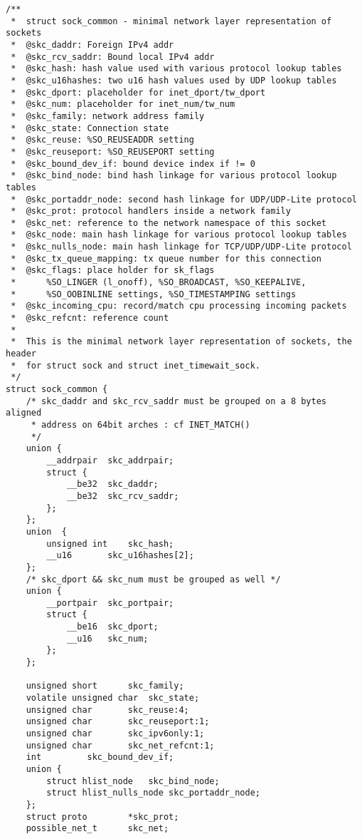 \begin{verbatim}
/**
 *  struct sock_common - minimal network layer representation of sockets
 *  @skc_daddr: Foreign IPv4 addr
 *  @skc_rcv_saddr: Bound local IPv4 addr
 *  @skc_hash: hash value used with various protocol lookup tables
 *  @skc_u16hashes: two u16 hash values used by UDP lookup tables
 *  @skc_dport: placeholder for inet_dport/tw_dport
 *  @skc_num: placeholder for inet_num/tw_num
 *  @skc_family: network address family
 *  @skc_state: Connection state
 *  @skc_reuse: %SO_REUSEADDR setting
 *  @skc_reuseport: %SO_REUSEPORT setting
 *  @skc_bound_dev_if: bound device index if != 0
 *  @skc_bind_node: bind hash linkage for various protocol lookup tables
 *  @skc_portaddr_node: second hash linkage for UDP/UDP-Lite protocol
 *  @skc_prot: protocol handlers inside a network family
 *  @skc_net: reference to the network namespace of this socket
 *  @skc_node: main hash linkage for various protocol lookup tables
 *  @skc_nulls_node: main hash linkage for TCP/UDP/UDP-Lite protocol
 *  @skc_tx_queue_mapping: tx queue number for this connection
 *  @skc_flags: place holder for sk_flags
 *      %SO_LINGER (l_onoff), %SO_BROADCAST, %SO_KEEPALIVE,
 *      %SO_OOBINLINE settings, %SO_TIMESTAMPING settings
 *  @skc_incoming_cpu: record/match cpu processing incoming packets
 *  @skc_refcnt: reference count
 *
 *  This is the minimal network layer representation of sockets, the header
 *  for struct sock and struct inet_timewait_sock.
 */
struct sock_common {
    /* skc_daddr and skc_rcv_saddr must be grouped on a 8 bytes aligned
     * address on 64bit arches : cf INET_MATCH()
     */
    union {
        __addrpair  skc_addrpair;
        struct {
            __be32  skc_daddr;
            __be32  skc_rcv_saddr;
        };
    };
    union  {
        unsigned int    skc_hash;
        __u16       skc_u16hashes[2];
    };
    /* skc_dport && skc_num must be grouped as well */
    union {
        __portpair  skc_portpair;
        struct {
            __be16  skc_dport;
            __u16   skc_num;
        };
    };

    unsigned short      skc_family;
    volatile unsigned char  skc_state;
    unsigned char       skc_reuse:4;
    unsigned char       skc_reuseport:1;
    unsigned char       skc_ipv6only:1;
    unsigned char       skc_net_refcnt:1;
    int         skc_bound_dev_if;
    union {
        struct hlist_node   skc_bind_node;
        struct hlist_nulls_node skc_portaddr_node;
    };
    struct proto        *skc_prot;
    possible_net_t      skc_net;


\end{verbatim}
